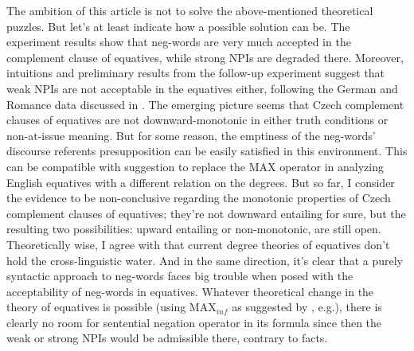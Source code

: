 The ambition of this article is not to solve the above-mentioned theoretical puzzles. But let's at least indicate how a possible solution can be. The experiment results show that neg-words are very much accepted in the complement clause of equatives, while strong NPIs are degraded there. Moreover, intuitions and preliminary results from the follow-up experiment suggest that weak NPIs are not acceptable in the equatives either, following the German and Romance data discussed in \citet{krifka1992some,penka2016degree}. The emerging picture seems that Czech complement clauses of equatives are not downward-monotonic in either truth conditions or non-at-issue meaning. But for some reason, the emptiness of the neg-words' discourse referents presupposition can be easily satisfied in this environment. This can be compatible with  suggestion to replace the MAX operator in analyzing English equatives with a different relation on the degrees. But so far, I consider the evidence to be non-conclusive regarding the monotonic properties of Czech complement clauses of equatives; they're not downward entailing for sure, but the resulting two possibilities: upward entailing or non-monotonic, are still open. Theoretically wise, I agree with \citet{penka2016degree} that current degree theories of equatives don't hold the cross-linguistic water. And in the same direction, it's clear that a purely syntactic approach to neg-words faces big trouble when posed with the acceptability of neg-words in equatives. Whatever theoretical change in the theory of equatives is possible (using MAX$_{inf}$ as suggested by \cite{penka2016degree}, e.g.), there is clearly no room for sentential negation operator in its formula since then the weak or strong NPIs would be admissible there, contrary to facts.



  

